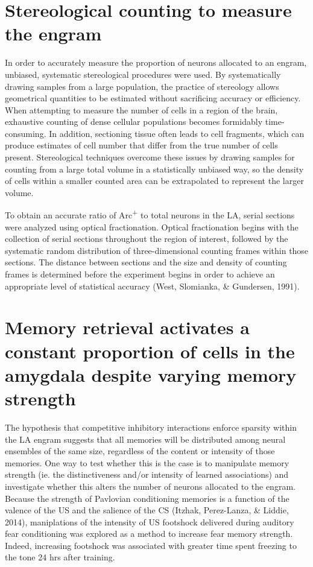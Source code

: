 \documentclass[12pt,a4paper,]{report}
\begin{document}
\section{Stereological counting to measure the
engram}\label{stereological-counting-to-measure-the-engram}

In order to accurately measure the proportion of neurons allocated to an
engram, unbiased, systematic stereological procedures were used. By
systematically drawing samples from a large population, the practice of
stereology allows geometrical quantities to be estimated without
sacrificing accuracy or efficiency. When attempting to measure the
number of cells in a region of the brain, exhaustive counting of dense
cellular populations becomes formidably time-consuming. In addition,
sectioning tissue often leads to cell fragments, which can produce
estimates of cell number that differ from the true number of cells
present. Stereological techniques overcome these issues by drawing
samples for counting from a large total volume in a statistically
unbiased way, so the density of cells within a smaller counted area can
be extrapolated to represent the larger volume.

To obtain an accurate ratio of Arc\textsuperscript{+} to total neurons
in the LA, serial sections were analyzed using optical fractionation.
Optical fractionation begins with the collection of serial sections
throughout the region of interest, followed by the systematic random
distribution of three-dimensional counting frames within those sections.
The distance between sections and the size and density of counting
frames is determined before the experiment begins in order to achieve an
appropriate level of statistical accuracy (West, Slomianka, \&
Gundersen, 1991).

\section{Memory retrieval activates a constant proportion of cells in
the amygdala despite varying memory
strength}\label{memory-retrieval-activates-a-constant-proportion-of-cells-in-the-amygdala-despite-varying-memory-strength-1}

The hypothesis that competitive inhibitory interactions enforce sparsity
within the LA engram suggests that all memories will be distributed
among neural ensembles of the same size, regardless of the content or
intensity of those memories. One way to test whether this is the case is
to manipulate memory strength (ie. the distinctiveness and/or intensity
of learned associations) and investigate whether this alters the number
of neurons allocated to the engram. Because the strength of Pavlovian
conditioning memories is a function of the valence of the US and the
salience of the CS (Itzhak, Perez-Lanza, \& Liddie, 2014), maniplations
of the intensity of US footshock delivered during auditory fear
conditioning was explored as a method to increase fear memory strength.
Indeed, increasing footshock was associated with greater time spent
freezing to the tone 24 hrs after training.
\end{document}
